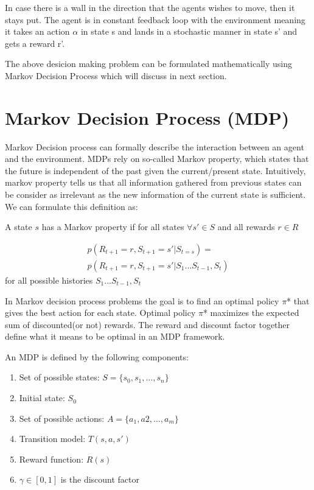 \documentclass[10pt,a4paper,twocolumn]{article}
\begin{document}
	

	In case there is a wall in the direction that the agents wishes to move, then it stays put.
	The agent is in constant feedback loop with the environment meaning it takes an action $\alpha$ in state s and lands in a stochastic manner in state s’ and gets a reward r'.
	
	The above desicion making problem can be formulated mathematically using Markov Decision Process which will discuss in next section.
	
	\section{Markov Decision Process (MDP)}
	
	Markov Decision process can formally describe the interaction between an agent and the environment. MDPs rely on so-called Markov property, which states that the future is independent of the past given the current/present state. Intuitively, markov property tells us that all information gathered from previous states can be consider as irrelevant as the new information of the current state is sufficient. We can formulate this definition as:
	
	A state $s$ has a Markov property if for all states $\forall{s'} \in S$ and all rewards $r \in R$
	
	\begin{equation}
		\begin{split}
			p(R_{t+1} = r , S_{t+1}=s' | S_{t=s}) = \\ 
		 	p(R_{t+1} = r , S_{t+1}=s' | S_{1} ... S_{t-1}, S_{t})
		\end{split}
	\end{equation}
	for all possible histories $ S_{1} ... S_{t-1}, S_{t} $
	
	In Markov decision process problems the goal is to find an optimal policy $\pi$* that gives  the best action for each state. Optimal policy $\pi$* maximizes the expected sum of discounted(or not) rewards. The reward and discount factor together define what it means to be optimal in an MDP framework.
	
	An MDP is defined by the following components:
	\begin{enumerate}
		\item Set of possible states: $S = \{ s_{0}, s_{1}, ..., s_{n} \}$
		\item Initial state: $S_{0}$
		\item Set of possible actions: $A = \{ a_{1}, a{2}, ..., a_{m} \}$
		\item Transition model: $T(s, a, s')$
		\item Reward function: $R(s)$
		\item $\gamma \in [0,1] $ is the discount factor
	\end{enumerate}
\end{document}
